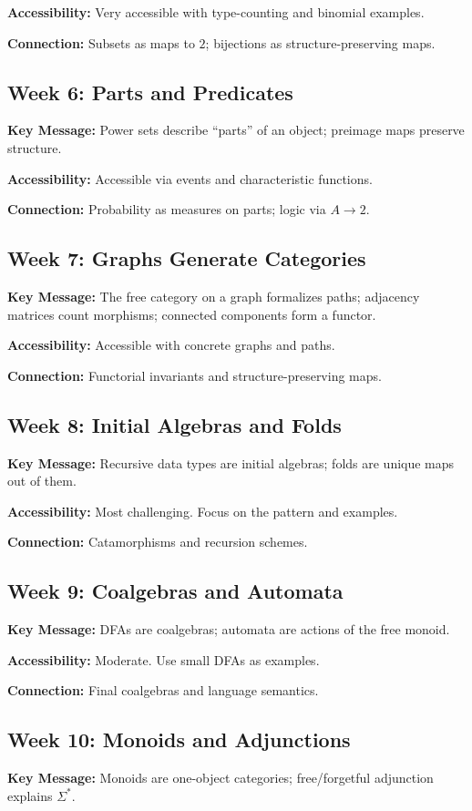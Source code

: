 \documentclass[11pt]{article}
\begin{document}
\textbf{Accessibility:} Very accessible with type-counting and binomial examples.

\textbf{Connection:} Subsets as maps to $2$; bijections as structure-preserving maps.

\subsection{Week 6: Parts and Predicates}
\textbf{Key Message:} Power sets describe ``parts'' of an object; preimage maps preserve structure.

\textbf{Accessibility:} Accessible via events and characteristic functions.

\textbf{Connection:} Probability as measures on parts; logic via $A \to 2$.

\subsection{Week 7: Graphs Generate Categories}
\textbf{Key Message:} The free category on a graph formalizes paths; adjacency matrices count morphisms; connected components form a functor.

\textbf{Accessibility:} Accessible with concrete graphs and paths.

\textbf{Connection:} Functorial invariants and structure-preserving maps.

\subsection{Week 8: Initial Algebras and Folds}
\textbf{Key Message:} Recursive data types are initial algebras; folds are unique maps out of them.

\textbf{Accessibility:} Most challenging. Focus on the pattern and examples.

\textbf{Connection:} Catamorphisms and recursion schemes.

\subsection{Week 9: Coalgebras and Automata}
\textbf{Key Message:} DFAs are coalgebras; automata are actions of the free monoid.

\textbf{Accessibility:} Moderate. Use small DFAs as examples.

\textbf{Connection:} Final coalgebras and language semantics.

\subsection{Week 10: Monoids and Adjunctions}
\textbf{Key Message:} Monoids are one-object categories; free/forgetful adjunction explains $\Sigma^*$.
\end{document}
